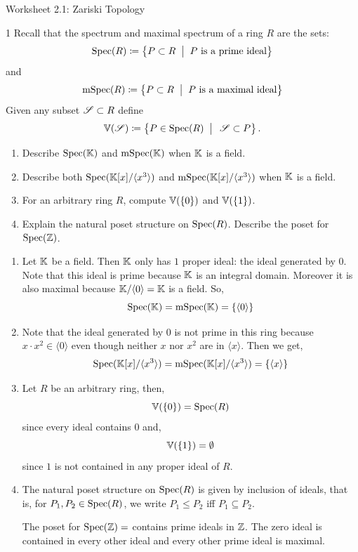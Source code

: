 \documentclass[Notebook.tex]{subfiles}
\begin{document}
\ifSubfilesClassLoaded{}{}


\begin{center}
    {Worksheet 2.1: Zariski Topology}
\end{center}


\begin{problem}{1}
Recall that the spectrum and maximal spectrum of a ring $R$ are the sets:
\[
\operatorname{Spec}(R) \coloneqq\left\{ P \subset R \;\; \big|\;\; \text{$P$ is a prime ideal}\right\}\]
and 
\[\operatorname{mSpec}(R) \coloneqq\left\{ P \subset R \;\; \big|\;\; \text{$P$ is a maximal ideal}\right\} 
\]
Given any subset $\operatorname{\mathscr S} \subset R$ define 
\[
\mathbb V(\operatorname{\mathscr S}) \coloneqq \left\{P \in \operatorname{Spec}(R) \;\; \big| \;\; \operatorname{\mathscr S} \subset P\right \}.
\]
\begin{enumerate}[label=(\alph*),ref=\theenumi\alph*]
	\item Describe $\operatorname{Spec}(\mathbb K)$ and $\operatorname{mSpec}(\mathbb K)$ when $\mathbb K$ is a field. 
	\item Describe both $\operatorname{Spec}(\mathbb K[x]/\langle x^{3}\rangle)$ and $\operatorname{mSpec}(\mathbb K[x]/\langle x^{3}\rangle)$ when $\mathbb K$ is a field. 
	\item For an arbitrary ring $R$, compute $\mathbb V(\{0\})$ and $\mathbb V(\{1\})$. 
	\item Explain the natural poset structure on $\operatorname{Spec}(R)$. Describe the poset for $\operatorname{Spec}(\mathbb Z)$. 
\end{enumerate}
\end{problem}

\begin{solution}
    \bbni 
    \begin{enumerate}[label=(\alph*),ref=\theenumi\alph*]
        \item Let $\mathbb K$ be a field. Then $\mathbb K$ only has $1$ proper ideal: the ideal generated by $0$. Note that this ideal is prime because $\mathbb K$ is an integral domain. Moreover it is also maximal because $\mathbb K/\langle 0 \rangle = \mathbb K$ is a field. So, 
        \[\operatorname{Spec}(\mathbb K) = \operatorname{mSpec}(\mathbb K) = \{\langle 0 \rangle\}\]

        \item Note that the ideal generated by $0$ is not prime in this ring because $x \cdot x^2 \in \langle 0 \rangle $ even though neither $x$ nor $x^2$ are in $\langle x\rangle$. Then we get, \[\operatorname{Spec}(\mathbb K[x]/\langle x^3 \rangle) =  \operatorname{mSpec}(\mathbb K[x]/\langle x^3 \rangle) = \{\langle x \rangle\}\] 
        
        \item Let $R$ be an arbitrary ring, then, 
        \[\mathbb V(\{0\}) = \operatorname{Spec}(R)\]
        since every ideal contains $0$ and, 
        \[\mathbb V(\{1\}) = \emptyset\]
        since $1$ is not contained in any proper ideal of $R$.
        
        \item 
        The natural poset structure on $\operatorname{Spec}(R)$ is given by inclusion of ideals, that is, for $P_1, P_2 \in \operatorname{Spec}(R)$, we write $P_1 \le P_2$ iff $P_1 \subseteq P_2$.

        The poset for $\operatorname{Spec}(\mathbb Z) = $ contains prime ideals in $\mathbb Z$. The zero ideal is contained in every other ideal and every other prime ideal is maximal. 
        
    \end{enumerate}
\end{solution}
\end{document}
